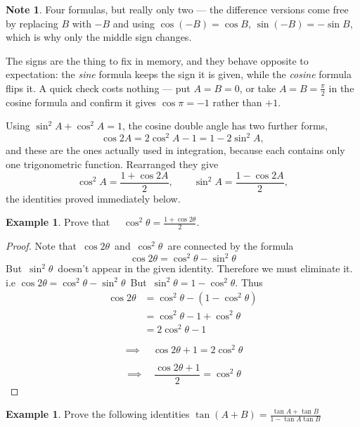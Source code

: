 \documentclass[11pt,a4paper]{article}
\theoremstyle{definition}
\newtheorem{example}[thm]{Example}
\newtheorem{note}[thm]{Note}
\begin{document}
\begin{note}
Four formulas, but really only two --- the difference versions come free by
replacing $B$ with $-B$ and using $\cos(-B)=\cos B$, $\sin(-B)=-\sin B$, which is
why only the middle sign changes.

The signs are the thing to fix in memory, and they behave opposite to
expectation: the \emph{sine} formula keeps the sign it is given, while the
\emph{cosine} formula flips it. A quick check costs nothing --- put $A=B=0$, or take
$A=B=\frac{\pi}{2}$ in the cosine formula and confirm it gives
$\cos\pi=-1$ rather than $+1$.

Using $\sin^{2}A+\cos^{2}A=1$, the cosine double angle has two further forms,
$$\cos 2A = 2\cos^{2}A-1 = 1-2\sin^{2}A,$$
and these are the ones actually used in integration, because each contains only
one trigonometric function. Rearranged they give
$$\cos^{2}A=\frac{1+\cos 2A}{2},\qquad \sin^{2}A=\frac{1-\cos 2A}{2},$$
the identities proved immediately below.
\end{note}
\begin{example}

Prove that $\quad \cos^2\theta =  \frac{1 + \cos 2\theta}{2}$.
\end{example}
\begin{proof}

Note that $\, \cos 2\theta\,$ and $\,\cos^2\theta\,$ are connected by the formula $$\cos 2\theta = \cos^2\theta - \sin^2\theta$$
But $\,\sin^2\theta\,$ doesn't appear in the given identity. Therefore we must eliminate it.\\

i.e $\cos 2\theta = \cos^2\theta - \sin^2\theta\,$ But $\,\sin^2\theta = 1 - \cos^2\theta$. Thus
\begin{align*}
\cos 2\theta & = \cos^2\theta - ( 1 - \cos^2\theta)\\
& = \cos^2\theta - 1 + \cos^2\theta\\
& = 2\cos^2\theta - 1
\end{align*} 

$$\implies \quad  \cos 2\theta + 1 = 2\cos^2\theta$$

$$\implies \quad  \frac{\cos 2\theta + 1}{2} = \cos^2\theta$$
\end{proof}
\pagebreak
\begin{example}
Prove the following identities $\displaystyle{\tan (A+B) = \frac{\tan A + \tan B}{1 - \tan A\tan B}}$
\end{example}
\end{document}
